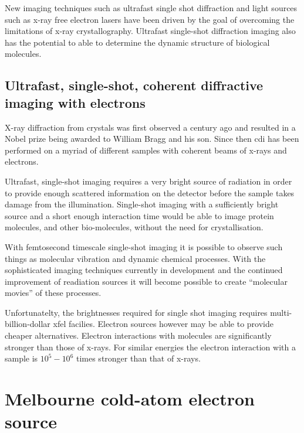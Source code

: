 New imaging techniques such as ultrafast single shot diffraction and light sources such as x-ray free electron lasers have been driven by the goal of overcoming the limitations of x-ray crystallography. Ultrafast single-shot diffraction imaging also has the potential to able to determine the dynamic structure of biological molecules.



\subsection{Ultrafast, single-shot, coherent diffractive imaging with electrons}

X-ray diffraction from crystals was first observed a century ago\cite{bragg_x-rays_1912} and resulted in a Nobel prize being awarded to William Bragg and his son. Since then \gls{cdi} has been performed on a myriad of different samples with coherent beams of x-rays and electrons.

Ultrafast, single-shot imaging requires a very bright source of radiation in order to provide enough scattered information on the detector before the sample takes damage from the illumination\cite{henderson_potential_1995}. Single-shot imaging with a sufficiently bright source and a short enough interaction time would be able to image protein molecules, and other bio-molecules, without the need for crystallisation.\cite{neutze_potential_2000}

With femtosecond timescale single-shot imaging it is possible to observe such things as molecular vibration and dynamic chemical processes\cite{zewail_4d_2006}. With the sophisticated imaging techniques currently in development and the continued improvement of readiation sources it will become possible to create ``molecular movies''\cite{dwyer_femtosecond_2006} of these processes.

Unfortunatelty, the brightnesses required for single shot imaging requires multi-billion-dollar \gls{xfel} facilies. Electron sources however may be able to provide cheaper alternatives. Electron interactions with molecules are significantly stronger than those of x-rays. For similar energies the electron interaction with a sample is $10^5-10^6$ times stronger than that of x-rays.\cite{sciaini_femtosecond_2011}

\section{Melbourne cold-atom electron source}

